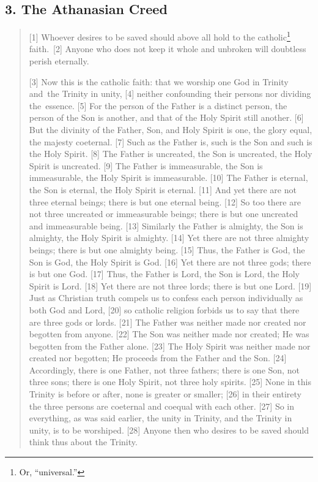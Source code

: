 \documentclass[
]{book}
\begin{document}
\hypertarget{the-athanasian-creed}{%
\subsection*{\texorpdfstring{3. \textbf{The Athanasian Creed}}{3. The Athanasian Creed}}\label{the-athanasian-creed}}

\begin{quote}
{[}1{]} Whoever desires to be saved should above all hold to the catholic\footnote{Or, ``universal.''} faith.~{[}2{]} Anyone who does not keep it whole and unbroken will doubtless perish eternally.

{[}3{]} Now this is the catholic faith: that we worship one God in Trinity and~the Trinity in unity, {[}4{]} neither confounding their persons nor dividing the~essence. {[}5{]} For the person of the Father is a distinct person, the person of the Son is another, and that of the Holy Spirit still another. {[}6{]} But the divinity of the Father, Son, and Holy Spirit is one, the glory equal, the majesty coeternal. {[}7{]} Such as the Father is, such is the Son and such is the Holy Spirit. {[}8{]} The Father is uncreated, the Son is uncreated, the Holy Spirit is uncreated. {[}9{]} The Father is immeasurable, the Son is immeasurable, the Holy Spirit is immeasurable. {[}10{]} The Father is eternal, the Son is eternal, the Holy Spirit is eternal. {[}11{]} And yet there are not three eternal beings; there is but one eternal being. {[}12{]} So too there are not three uncreated or immeasurable beings; there is but one uncreated and immeasurable being. {[}13{]} Similarly the Father is almighty, the Son is almighty, the Holy Spirit is almighty. {[}14{]} Yet there are not three almighty beings; there is but one almighty being. {[}15{]} Thus, the Father is God, the Son is God, the Holy Spirit is God. {[}16{]} Yet there are not three gods; there is but one God. {[}17{]} Thus, the Father is Lord, the Son is Lord, the Holy Spirit is Lord. {[}18{]} Yet there are not three lords; there is but one Lord. {[}19{]} Just as Christian truth compels us to confess each person individually as both God and Lord, {[}20{]} so catholic religion forbids us to say that there are three gods or lords. {[}21{]} The Father was neither made nor created nor begotten from anyone. {[}22{]} The Son was neither made nor created; He was begotten from the Father alone. {[}23{]} The Holy Spirit was neither made nor created nor begotten; He proceeds from the Father and the Son. {[}24{]} Accordingly, there is one Father, not three fathers; there is one Son, not three sons; there is one Holy Spirit, not three holy spirits. {[}25{]} None in this Trinity is before or after, none is greater or smaller; {[}26{]} in their entirety the three persons are coeternal and coequal with each other. {[}27{]} So in everything, as was said earlier, the unity in Trinity, and the Trinity in unity, is to be worshiped. {[}28{]} Anyone then who desires to be saved should think thus about the Trinity.


\end{quote}
\end{document}
